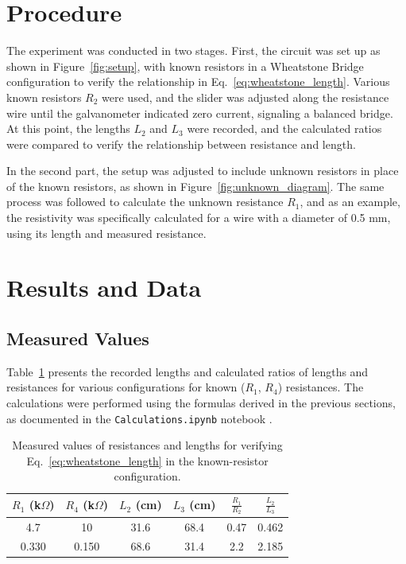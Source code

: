 \documentclass[journal]{IEEEtran}
\begin{document}
\section{Procedure}
The experiment was conducted in two stages. First, the circuit was set up as shown in Figure~\ref{fig:setup}, with known resistors in a Wheatstone Bridge configuration to verify the relationship in Eq.~\ref{eq:wheatstone_length}. Various known resistors \( R_2 \) were used, and the slider was adjusted along the resistance wire until the galvanometer indicated zero current, signaling a balanced bridge. At this point, the lengths \( L_2 \) and \( L_3 \) were recorded, and the calculated ratios were compared to verify the relationship between resistance and length.

In the second part, the setup was adjusted to include unknown resistors in place of the known resistors, as shown in Figure~\ref{fig:unknown_diagram}. The same process was followed to calculate the unknown resistance \( R_1 \), and as an example, the resistivity was specifically calculated for a wire with a diameter of 0.5 mm, using its length and measured resistance.

\label{sec:procedure}
\section{Results and Data}

\subsection{Measured Values}
Table~\ref{tab:results} presents the recorded lengths and calculated 
ratios of lengths and resistances for various configurations for known ($R_1$, $R_4$) resistances. The calculations were performed using 
the formulas derived in the previous sections, as documented in the 
\texttt{Calculations.ipynb} notebook \cite{github}.

\begin{table}[H]
\centering
\begin{tabular}{cccccc}
\hline
$R_1$ (k$\Omega$) & $R_4$ (k$\Omega$) & $L_2$ (cm) & $L_3$ (cm) & $\frac{R_1}{R_2}$ & $\frac{L_2}{L_3}$\\
\hline
4.7 & 10 & 31.6 & 68.4 & 0.47 & 0.462 \\
0.330 & 0.150 & 68.6 & 31.4 & 2.2 & 2.185\\
\hline
\end{tabular}
\caption{Measured values of resistances and lengths for verifying Eq.~\ref{eq:wheatstone_length} in the known-resistor configuration.}
\label{tab:results}
\end{table}
\end{document}

